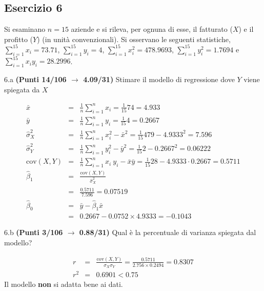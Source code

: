 \documentclass[
  11pt,
]{book}
\theoremstyle{mytheoremstyle}
\theoremstyle{mydefstyle}
\newenvironment{sol}
  {
  \begin{tcolorbox}[enhanced,breakable,arc=0.1mm,boxrule=1pt,colback=white,colframe=iblue,
  title=\bf \fontfamily{lmss}\selectfont \hspace{.5 cm} Soluzione,drop fuzzy shadow]

}{
\end{tcolorbox}
  }
\begin{document}
\subsection{Esercizio 6}\label{esercizio-6-7}

Si esaminano \(n=15\) aziende e si rileva, per ognuna di esse, il
fatturato (\(X\)) e il profitto (\(Y\)) (in unità convenzionali).
Si osservano le seguenti statistiche, \(\sum_{i=1}^{15}x_i=73.71\), \(\sum_{i=1}^{15}y_i=4\),
\(\sum_{i=1}^{15}x_i^2=478.9693\), \(\sum_{i=1}^{15}y_i^2=1.7694\) e \(\sum_{i=1}^{15}x_iy_i=28.2996\).

6.a \textbf{(Punti 14/106 \(\rightarrow\) 4.09/31)} Stimare il modello di regressione dove \(Y\) viene spiegata da \(X\)

\begin{sol}
\begin{eqnarray*}
           \bar x &=&\frac 1 n\sum_{i=1}^n x_i = \frac {1}{ 15 }  74 =  4.933 \\
           \bar y &=&\frac 1 n\sum_{i=1}^n y_i = \frac {1}{ 15 }  4 =  0.2667 \\
           \hat\sigma_X^2&=&\frac 1 n\sum_{i=1}^n x_i^2-\bar x^2=\frac {1}{ 15 }  479  - 4.9333 ^2= 7.596 \\
           \hat\sigma_Y^2&=&\frac 1 n\sum_{i=1}^n y_i^2-\bar y^2=\frac {1}{ 15 }  2  - 0.2667 ^2= 0.06222 \\
           \text{cov}(X,Y)&=&\frac 1 n\sum_{i=1}^n x_i~y_i-\bar x\bar y=\frac {1}{ 15 }  28 - 4.9333 \cdot 0.2667 = 0.5711 \\
           \hat\beta_1 &=& \frac{\text{cov}(X,Y)}{\hat\sigma_X^2} \\
                    &=& \frac{ 0.5711 }{ 7.596 }  =  0.07519 \\
           \hat\beta_0 &=& \bar y - \hat\beta_1 \bar x\\
                    &=&  0.2667 - 0.0752 \times  4.9333 = -0.1043 
         \end{eqnarray*}

\end{sol}

6.b \textbf{(Punti 3/106 \(\rightarrow\) 0.88/31)} Qual è la percentuale di varianza spiegata dal modello?

\begin{sol}
\begin{eqnarray*}
r&=&\frac{\text{cov}(X,Y)}{\sigma_X\sigma_Y}=\frac{ 0.5711 }{ 2.756 \times 0.2494 }= 0.8307 \\r^2&=& 0.6901 < 0.75
\end{eqnarray*}
Il modello \textbf{non} si adatta bene ai dati.

\end{sol}
\end{document}
